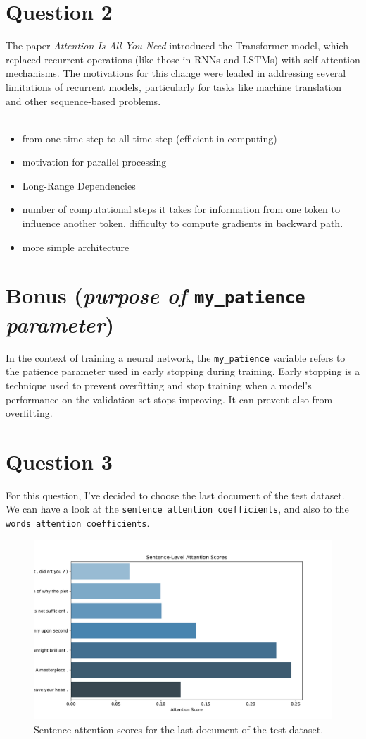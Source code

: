 \documentclass[a4paper]{article}
\begin{document}
\section{Question 2}
\noindent
The paper \textit{Attention Is All You Need} introduced the Transformer model, which replaced recurrent operations (like those in RNNs and LSTMs) with self-attention mechanisms. The motivations for this change were leaded in addressing several limitations of recurrent models, particularly for tasks like machine translation and other sequence-based problems.
\\
\\
\noindent
\begin{itemize}
    \item from one time step to all time step (efficient in computing)
    \item motivation for parallel processing
    \item Long-Range Dependencies
    \item number of computational steps it takes for information from one token to influence another token. difficulty to compute gradients in backward path.
    \item more simple architecture
\end{itemize}

\section{Bonus (\textit{purpose of} \texttt{my\_patience} \textit{parameter})}
\noindent
In the context of training a neural network, the \texttt{my\_patience} variable refers to the patience parameter used in early stopping during training. Early stopping is a technique used to prevent overfitting and stop training when a model’s performance on the validation set stops improving. It can prevent also from overfitting.

\section{Question 3}
\noindent
For this question, I've decided to choose the last document of the test dataset. We can have a look at the
\texttt{sentence attention coefficients}, and also to the \texttt{words attention coefficients}.

\begin{figure}[H]
    \centering
    \includegraphics[width=.5\linewidth]{../figures/Sentence_attention_scores.pdf}
    \caption{Sentence attention scores for the last document of the test dataset.}
    \label{sentence-scores}    
\end{figure}
\end{document}
